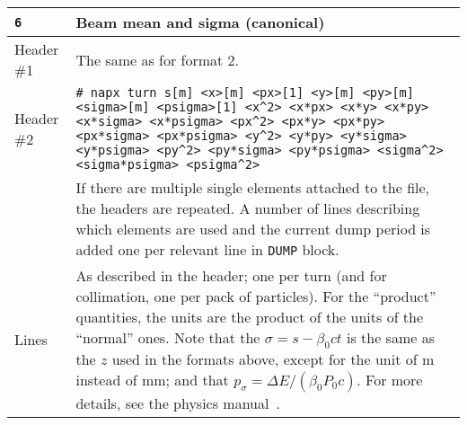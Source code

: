 \begin{center}
\begin{longtable}{|p{1.8cm}|p{13.8cm}|}
        \rowcolor{blue!15}
        \texttt{6} & Beam mean and sigma (canonical) \\
        \hline
        Header \#1 & The same as for format 2.\\
        \hline
        Header \#2 & \texttt{\# napx turn s[m] <x>[m] <px>[1] <y>[m] <py>[m] <sigma>[m] <psigma>[1] <x\^{}2> <x*px> <x*y> <x*py> <x*sigma> <x*psigma> <px\^{}2> <px*y> <px*py> <px*sigma> <px*psigma> <y\^{}2> <y*py> <y*sigma> <y*psigma> <py\^{}2> <py*sigma> <py*psigma> <sigma\^{}2> <sigma*psigma> <psigma\^{}2>}\vspace{1mm}\\
                   & If there are multiple single elements attached to the file, the headers are repeated. A number of lines describing which elements are used and the current dump period is added one per relevant line in \texttt{DUMP} block.\\
        \hline
        Lines      & As described in the header; one per turn (and for collimation, one per pack of particles). For the ``product'' quantities, the units are the product of the units of the ``normal'' ones. Note that the $\sigma=s -\beta_0 c t$ is the same as the $z$ used in the formats above, except for the unit of m instead of mm; and that $p_\sigma = \Delta E / \left(\beta_0 P_0 c\right)$. For more details, see the physics manual~\cite{sixphys}. \\
        \hline


\end{longtable}
\end{center}
